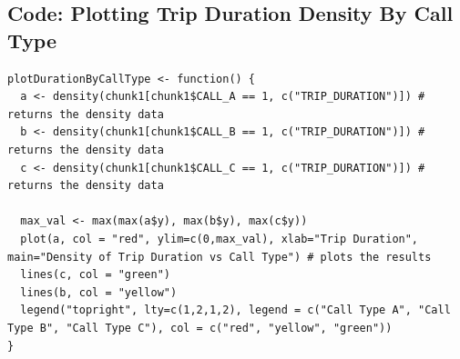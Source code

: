 \documentclass{article}
\numberwithin{equation}{section}
\begin{document}
\subsection{Code: Plotting Trip Duration Density By Call Type} 
\begin{lstlisting}
plotDurationByCallType <- function() {
  a <- density(chunk1[chunk1$CALL_A == 1, c("TRIP_DURATION")]) # returns the density data
  b <- density(chunk1[chunk1$CALL_B == 1, c("TRIP_DURATION")]) # returns the density data
  c <- density(chunk1[chunk1$CALL_C == 1, c("TRIP_DURATION")]) # returns the density data
  
  max_val <- max(max(a$y), max(b$y), max(c$y))
  plot(a, col = "red", ylim=c(0,max_val), xlab="Trip Duration", main="Density of Trip Duration vs Call Type") # plots the results
  lines(c, col = "green") 
  lines(b, col = "yellow") 
  legend("topright", lty=c(1,2,1,2), legend = c("Call Type A", "Call Type B", "Call Type C"), col = c("red", "yellow", "green"))
}
\end{lstlisting}
\end{document}
